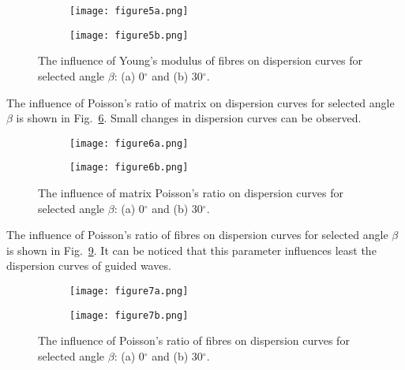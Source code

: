 \begin{figure} [h!]
	\centering
	\begin{subfigure}[b]{0.49\textwidth}
		\centering
							\texttt{[image: figure5a.png]}
		\caption{}
		\label{fig:ef0}
	\end{subfigure}
	\hfill
	\begin{subfigure}[b]{0.49\textwidth}
		\centering
								\texttt{[image: figure5b.png]}
		\caption{}
		\label{fig:ef30}
	\end{subfigure}
		
\caption{The influence of Young's modulus of fibres on dispersion curves for 
		selected angle \(\beta\): (a) 0\(^{\circ}\) and (b) 30\(^{\circ}\).}
 
	\label{fig:ef}
\end{figure}

The influence of  Poisson's ratio of matrix on dispersion curves for selected angle 
\(\beta\) is shown in Fig.~\ref{fig:nim}. Small changes in dispersion curves can be 
observed.


\begin{figure} [h!]
	\centering
	\begin{subfigure}[b]{0.49\textwidth}
		\centering
							\texttt{[image: figure6a.png]}
		\caption{}
		\label{fig:nim0}
	\end{subfigure}
	\hfill
	\begin{subfigure}[b]{0.49\textwidth}
		\centering
								\texttt{[image: figure6b.png]}
		\caption{}
		\label{fig:nim30}
	\end{subfigure}
	
\caption{The influence of matrix Poisson's ratio on dispersion curves for selected 
	angle \(\beta\): (a) 0\(^{\circ}\) and (b) 30\(^{\circ}\).}

	\label{fig:nim}
\end{figure}

The influence of Poisson's ratio of fibres  on dispersion curves for selected angle 
\(\beta\) is shown in Fig.~\ref{fig:nif}. It can be noticed that this parameter influences 
least the dispersion curves of guided waves.


\begin{figure} [h!]
	\centering
	\begin{subfigure}[b]{0.49\textwidth}
		\centering
							\texttt{[image: figure7a.png]}
		\caption{}
		\label{fig:nif0}
	\end{subfigure}
	\hfill
	\begin{subfigure}[b]{0.49\textwidth}
		\centering
								\texttt{[image: figure7b.png]}
		\caption{}
		\label{fig:nif30}
	\end{subfigure}
	
\caption{The influence of Poisson's ratio of fibres on dispersion curves for selected 
	angle \(\beta\): (a) 0\(^{\circ}\) and (b) 30\(^{\circ}\).}
 
	\label{fig:nif}
\end{figure}

